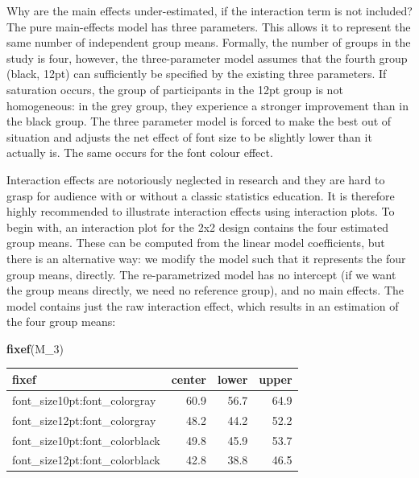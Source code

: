 \documentclass[]{svmono}
\newenvironment{Shaded}{\begin{snugshade}}{\end{snugshade}}
\newcommand{\KeywordTok}[1]{\textcolor[rgb]{0.13,0.29,0.53}{\textbf{#1}}}
\newcommand{\DataTypeTok}[1]{\textcolor[rgb]{0.13,0.29,0.53}{#1}}
\newcommand{\DecValTok}[1]{\textcolor[rgb]{0.00,0.00,0.81}{#1}}
\newcommand{\StringTok}[1]{\textcolor[rgb]{0.31,0.60,0.02}{#1}}
\newcommand{\OperatorTok}[1]{\textcolor[rgb]{0.81,0.36,0.00}{\textbf{#1}}}
\newcommand{\NormalTok}[1]{#1}
\begin{document}
Why are the main effects under-estimated, if the interaction term is not
included? The pure main-effects model has three parameters. This allows
it to represent the same number of independent group means. Formally,
the number of groups in the study is four, however, the three-parameter
model assumes that the fourth group (black, 12pt) can sufficiently be
specified by the existing three parameters. If saturation occurs, the
group of participants in the 12pt group is not homogeneous: in the grey
group, they experience a stronger improvement than in the black group.
The three parameter model is forced to make the best out of situation
and adjusts the net effect of font size to be slightly lower than it
actually is. The same occurs for the font colour effect.

Interaction effects are notoriously neglected in research and they are
hard to grasp for audience with or without a classic statistics
education. It is therefore highly recommended to illustrate interaction
effects using interaction plots. To begin with, an interaction plot for
the 2x2 design contains the four estimated group means. These can be
computed from the linear model coefficients, but there is an alternative
way: we modify the model such that it represents the four group means,
directly. The re-parametrized model has no intercept (if we want the
group means directly, we need no reference group), and no main effects.
The model contains just the raw interaction effect, which results in an
estimation of the four group means:

\begin{Shaded}
\end{Shaded}

\begin{Shaded}
\begin{Highlighting}[]
\KeywordTok{fixef}\NormalTok{(M_}\DecValTok{3}\NormalTok{)}
\end{Highlighting}
\end{Shaded}

\begin{longtable}[]{@{}lrrr@{}}
\toprule
fixef & center & lower & upper\tabularnewline
\midrule
\endhead
font\_size10pt:font\_colorgray & 60.9 & 56.7 & 64.9\tabularnewline
font\_size12pt:font\_colorgray & 48.2 & 44.2 & 52.2\tabularnewline
font\_size10pt:font\_colorblack & 49.8 & 45.9 & 53.7\tabularnewline
font\_size12pt:font\_colorblack & 42.8 & 38.8 & 46.5\tabularnewline
\bottomrule
\end{longtable}
\end{document}
